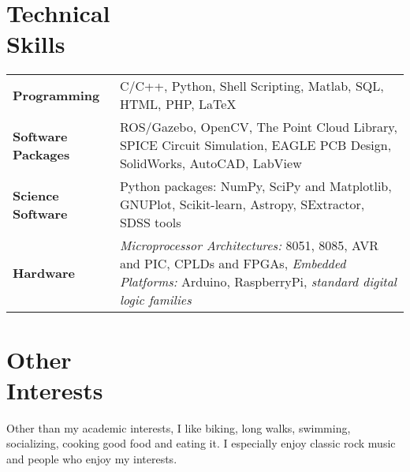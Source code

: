 \documentclass[margin,line]{res}
\begin{document}
\begin{resume}
\section{\sc Technical \\Skills} 
\begin{tabular}{@{}p{1.3in}p{4.3in}}
\textbf{Programming} & C/C++, Python, Shell Scripting, Matlab, SQL, HTML, PHP, \LaTeX \\  
\vspace*{-0.06in}
\textbf{Software Packages} & 
\vspace*{-0.06in}
ROS/Gazebo, OpenCV, The Point Cloud Library, SPICE Circuit Simulation, EAGLE PCB Design, SolidWorks, AutoCAD, LabView\\ 
\vspace*{-0.06in}
\textbf{Science Software} &
\vspace*{-0.06in}
Python packages: NumPy, SciPy and Matplotlib, GNUPlot, Scikit-learn, Astropy, SExtractor, SDSS tools \\
\vspace*{-0.06in}
\textbf{Hardware} &
\vspace*{-0.06in}
\textit{Microprocessor Architectures:} 8051, 8085, AVR and PIC, CPLDs and FPGAs, \textit{Embedded Platforms:} Arduino, RaspberryPi, \textit{standard digital logic families} \\     
\end{tabular}

\section{\sc Other \\Interests}
Other than my academic interests, I like biking, long walks, swimming, socializing, cooking good food and eating it. I especially enjoy classic rock music and people who enjoy my interests.


\end{resume}
\end{document}

